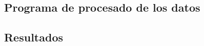 \documentclass[a4paper,openright, 12pt]{book}
\begin{document}
\subsection{Programa de procesado de los datos}


\subsection{Resultados}

\cleardoublepage
{}
\end{document}
